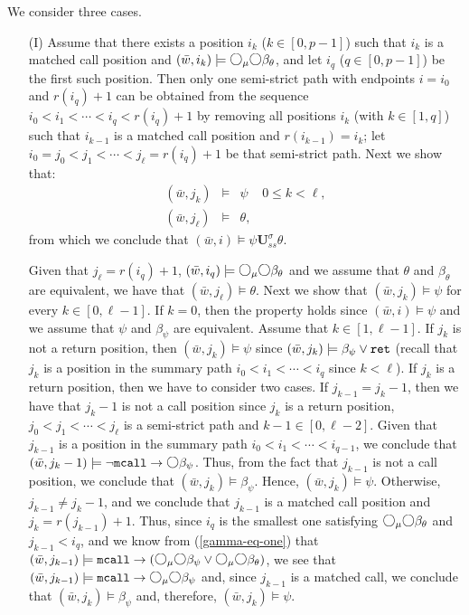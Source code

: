 \documentclass{LMCS}
\newcommand{\M}{{\mu}}
\newcommand{\w}{{\bar{w}}}
\newcommand{\dm}{\Diamond}
\newcommand{\U}{{\mathbf U}}
\newcommand{\next}{\text{\raisebox{1pt}{$\bigcirc$}}}
\theoremstyle{plain}
\theoremstyle{definition}
\newcommand{\ppath}{\sigma} \newcommand{\Ul}{\U}
\newcommand{\Up}{\U^\ppath}
\newcommand{\Uss}{\Up_{ss}}
\newcommand{\mcall}{{\tt{mcall}}}
\newcommand{\rett}{{\tt ret}}
\newcommand{\dmm}{\dm_{\M}}
\renewcommand{\dm}{\next}
\renewcommand{\dmm}{\dm_\M}
\begin{document}
We consider three cases. 
\begin{enumerate}[(a)]
\item[(I)] Assume that there exists a position $i_k$ ($k \in [0,
p-1]$) such that $i_k$ is a matched call position and $(\w, i_k)
\models \dmm \dm \beta_\theta$, and let $i_q$ ($q \in [0, p-1]$) be
the first such position. Then only one semi-strict path with
endpoints $i = i_0$ and $r(i_q)+1$ can be obtained from the sequence
$i_0 < i_1 < \cdots < i_q < r(i_q)+1$ by removing all positions $i_k$
(with $k \in [1, q]$) such that $i_{k-1}$ is a matched call position and
$r(i_{k-1}) = i_k$; let $i_0 = j_0 < j_1 < \cdots < j_\ell = r(i_q)+1$
be that semi-strict path. Next we show that: 
\begin{eqnarray*}
(\w, j_k) & \models & \psi \ \ \ \ \ 0 \leq k < \ell,\\
(\w, j_\ell) & \models & \theta,
\end{eqnarray*}
from which we conclude that $(\w, i) \models \psi \Uss \theta$. 

Given that $j_\ell = r(i_q)+1$, $(\w, i_q) \models \dmm \dm
\beta_\theta$ and we assume that $\theta$ and $\beta_\theta$ are
equivalent, we have that $(\w, j_\ell) \models \theta$. Next we show
that $(\w, j_k) \models \psi$ for every $k \in [0,\ell-1]$. If $k =
0$, then the property holds since $(\w, i) \models \psi$ and we assume
that $\psi$ and $\beta_\psi$ are equivalent. Assume that $k \in
[1,\ell-1]$. If $j_k$ is not a return position, then $(\w, j_k)
\models \psi$ since $(\w, j_k) \models \beta_\psi \vee \rett$ (recall
that $j_k$ is a position in the summary path $i_0 < i_1 < \cdots <
i_q$ since $k < \ell$). If $j_k$ is a return position, then we have to
consider two cases. If $j_{k-1} = j_k-1$, then we have that $j_k-1$ is
not a call position since $j_k$ is a return position, $j_0 < j_1 <
\cdots < j_\ell$ is a semi-strict path and $k-1 \in
[0,\ell-2]$. Given that $j_{k-1}$ is a position in the summary path
$i_0 < i_1 < \cdots < i_{q-1}$, we conclude that $(\w, j_k-1) \models
\neg \mcall \to \dm \beta_\psi$. Thus, from the fact that $j_{k-1}$ is
not a call position, we conclude that $(\w, j_k) \models
\beta_\psi$. Hence, $(\w, j_k) \models \psi$. Otherwise, $j_{k-1} \neq
j_k-1$, and we conclude that $j_{k-1}$ is a matched call position and
$j_k = r(j_{k-1}) + 1$. Thus, since $i_q$ is the smallest one
satisfying $\dmm\dm\beta_\theta$ and $j_{k-1} < i_q$, 
and we know from  (\ref{gamma-eq-one}) that
$(\w, j_{k-1}) \models \mcall \to (\dmm \dm \beta_\psi \vee \dmm \dm
\beta_\theta)$, we see that 
 $(\w, j_{k-1}) \models
\mcall \to \dmm 
\dm \beta_\psi$ and, since  $j_{k-1}$ is a
matched call, we conclude that $(\w, j_k) \models \beta_\psi$ and,
therefore, $(\w, j_k) \models \psi$.



\end{enumerate}
\end{document}
